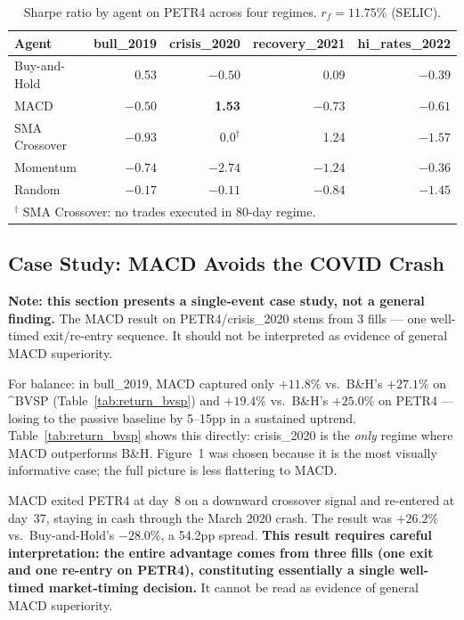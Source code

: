 \documentclass{article}
\begin{document}
\begin{table}[h]
\centering
\caption{Sharpe ratio by agent on PETR4 across four regimes.
  $r_f = 11.75\%$ (SELIC).}
\label{tab:sharpe_petr4}
\begin{tabular}{lrrrr}
\toprule
\textbf{Agent} & \textbf{\footnotesize bull\_2019}
  & \textbf{\footnotesize crisis\_2020}
  & \textbf{\footnotesize recovery\_2021}
  & \textbf{\footnotesize hi\_rates\_2022} \\
\midrule
Buy-and-Hold  &  0.53 & $-0.50$ &  0.09 & $-0.39$ \\
MACD          & $-0.50$ & \textbf{1.53} & $-0.73$ & $-0.61$ \\
SMA Crossover & $-0.93$ & 0.0$^{\dag}$ &  1.24 & $-1.57$ \\
Momentum      & $-0.74$ & $-2.74$ & $-1.24$ & $-0.36$ \\
Random        & $-0.17$ & $-0.11$ & $-0.84$ & $-1.45$ \\
\bottomrule
\multicolumn{5}{l}{\footnotesize $^{\dag}$ SMA Crossover: no trades
  executed in 80-day regime.}
\end{tabular}
\end{table}

\subsection{Case Study: MACD Avoids the COVID Crash}

\textbf{Note: this section presents a single-event case study, not a
general finding.} The MACD result on PETR4/crisis\_2020 stems from
3 fills --- one well-timed exit/re-entry sequence. It should not be
interpreted as evidence of general MACD superiority.

For balance: in bull\_2019, MACD captured only $+11.8\%$ vs.\ B\&H's
$+27.1\%$ on \^{}BVSP (Table~\ref{tab:return_bvsp}) and $+19.4\%$
vs.\ B\&H's $+25.0\%$ on PETR4 --- losing to the passive baseline
by 5--15pp in a sustained uptrend. Table~\ref{tab:return_bvsp} shows this
directly: crisis\_2020 is the \emph{only} regime where MACD
outperforms B\&H. Figure~1 was chosen because it is the most
visually informative case; the full picture is less flattering to
MACD.

MACD exited PETR4 at day~8 on a downward crossover signal and
re-entered at day~37, staying in cash through the March 2020 crash.
The result was $+26.2\%$ vs.\ Buy-and-Hold's $-28.0\%$, a 54.2pp
spread. \textbf{This result requires careful interpretation: the
entire advantage comes from three fills (one exit and one re-entry
on PETR4), constituting essentially a single well-timed market-timing
decision.} It cannot be read as evidence of general MACD superiority.
\end{document}
